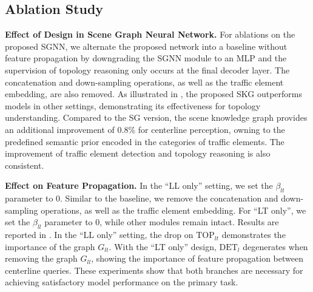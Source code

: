 \begin{table}[t!]
    \centering
    \caption{\textbf{Ablation on the number of GNN layers} in the scene knowledge graph. Model performance drops as the number of SGNN layers increases.}
    \label{tab:ab:gnnlayer}
    \vspace{-5px}
\end{table} 



\subsection{Ablation Study}
\label{sec:exp-ablation}


\noindent
\textbf{Effect of Design in Scene Graph Neural Network.}
For ablations on the proposed SGNN, we alternate the proposed network into a baseline without feature propagation by downgrading the SGNN module to an MLP and the supervision of topology reasoning only occurs at the final decoder layer. The concatenation and down-sampling operations, as well as the traffic element embedding, are also removed. As illustrated in , the proposed SKG outperforms models in other settings, demonstrating its effectiveness for topology understanding.
Compared to the SG version, the scene knowledge graph provides an additional improvement of 0.8\% for centerline perception, owning to the predefined semantic prior encoded in the categories of traffic elements.
The improvement of traffic element detection and topology reasoning is also consistent.


\smallskip
\noindent
\textbf{Effect on Feature Propagation.}
In the ``LL only'' setting, we set the $\beta_{lt}$ parameter to 0. Similar to the baseline, we remove the concatenation and down-sampling operations, as well as the traffic element embedding.
For ``LT only'', we set the $\beta_{ll}$ parameter to 0, while other modules remain intact. 
Results are reported in .
In the ``LL only'' setting, the drop on $\text{TOP}_{lt}$ demonstrates the importance of the graph $G_{lt}$.
With the ``LT only'' design, $\text{DET}_l$ degenerates when removing the graph $G_{ll}$, showing the importance of feature propagation between centerline queries.
These experiments show that both branches are necessary for achieving satisfactory model performance on the primary task.


